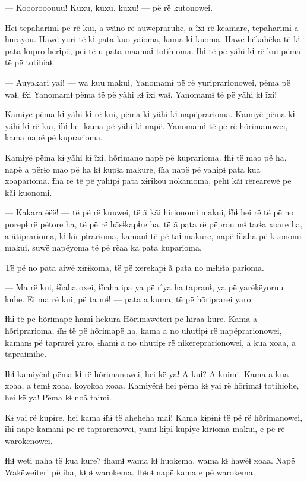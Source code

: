 --- Kooorooouuu! Kuxu, kuxu, kuxu! --- pë rë kutonowei. 

Hei tepaharimɨ pë rë kui, a wãno rë auwëpraruhe, a ĩxi rë keamare,
tepaharimɨ a hurayou. Hawë yuri të kɨ pata kuo yaioma, kama kɨ kuoma.
Hawë hẽkahẽka të kɨ pata kupro hërɨpë, pei të u pata maamaɨ totihioma.
Ɨhɨ të pë yãhi kɨ rë kui pëma të pë totihiaɨ. 

--- Auyakari yai! --- wa kuu makui, Yanomamɨ pë rë yuriprarionowei, pëma pë
waɨ, ɨ̃xi Yanomamɨ pëma të pë yãhi kɨ ĩxi waɨ. Yanomamɨ të pë yãhi kɨ
ĩxi! 

Kamiyë pëma kɨ yãhi kɨ rë kui, pëma kɨ yãhi kɨ napëprarioma. Kamiyë pëma
kɨ yãhi kɨ rë kui, ɨ̃hɨ hei kama pë yãhi kɨ napë. Yanomamɨ të pë rë
hõrimanowei, kama napë pë kuprarioma. 

Kamiyë pëma kɨ yãhi kɨ ĩxi, hõrimano napë pë kuprarioma. Ɨhɨ të mao pë
ha, napë a përɨo mao pë ha kɨ kupɨa makure, ɨ̃ha napë pë yahipɨ pata kua
xoaparioma. Ɨha rë të pë yahipɨ pata xɨrɨkou nokamoma, pehi kãi
rërëarewë pë kãi kuonomi. 

--- Kakara ëëë! --- të pë rë kuuwei, të ã kãi hirionomi makui, ɨ̃hɨ hei rë
të pë no porepɨ rë pëtore ha, të pë rë hãsɨkapɨre ha, të ã pata rë
pëprou mɨ tarɨa xoare ha, a ãtiprarioma, kɨ kiripɨrarioma, kamanɨ të pë
taɨ makure, napë ɨ̃naha pë kuonomi makui, suwë napëyoma të pë rẽaa ka
pata kuparioma. 

Të pë no pata aiwë xɨrɨkoma, të pë xerekapɨ ã pata no mɨhɨta parioma. 

--- Ma rë kui, ɨ̃naha oxei, ɨ̃naha ipa ya pë rĩya ha tapranɨ, ya pë
yarëkëyoruu kuhe. Ei ma rë kui, pë ta mɨ! --- pata a kuma, të pë
hõriprarei yaro. 

Ɨhɨ të pë hõrimapë hamɨ hekura Hõrimawëteri pë hiraa kure. Kama a
hõriprarioma, ɨ̃hɨ të pë hõrimapë ha, kama a no uhutipɨ rë
napëprarionowei, kamanɨ pë taprarei yaro, ɨ̃hamɨ a no uhutipɨ rë
nikereprarionowei, a kua xoaa, a tapraimihe. 

Ɨhɨ kamiyënɨ pëma kɨ rë hõrimanowei, hei kë ya! A kuɨ? A kuimi. Kama a
kua xoaa, a temɨ xoaa, koyokoa xoaa. Kamiyënɨ hei pëma kɨ yai rë hõrimaɨ
totihiohe, hei kë ya! Pëma kɨ noã taimi. 

Kɨ yai rë kupɨre, hei kama ɨ̃hɨ të aheheha mai! Kama kɨpɨnɨ të pë rë
hõrimanowei, ɨ̃hɨ napë kamanɨ pë rë taprarenowei, yami kɨpɨ kupɨye
kirioma makui, e pë rë warokenowei. 

Ɨhɨ weti naha të kua kure? Ɨhamɨ wama kɨ huokema, wama kɨ hawëɨ xoaa.
Napë Wakëweiteri pë iha, kɨpɨ warokema. Ɨhɨnɨ napë kama e pë warokema. 


